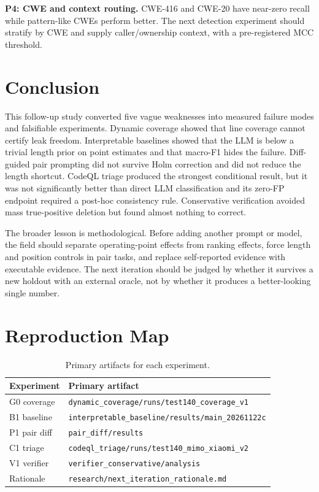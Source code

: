 \documentclass[conference]{IEEEtran}
\begin{document}
\textbf{P4: CWE and context routing.}
CWE-416 and CWE-20 have near-zero recall while pattern-like CWEs perform better. The next detection experiment should stratify by CWE and supply caller/ownership context, with a pre-registered MCC threshold.

\section{Conclusion}
\label{sec:conclusion}

This follow-up study converted five vague weaknesses into measured failure modes and falsifiable experiments. Dynamic coverage showed that line coverage cannot certify leak freedom. Interpretable baselines showed that the LLM is below a trivial length prior on point estimates and that macro-F1 hides the failure. Diff-guided pair prompting did not survive Holm correction and did not reduce the length shortcut. CodeQL triage produced the strongest conditional result, but it was not significantly better than direct LLM classification and its zero-FP endpoint required a post-hoc consistency rule. Conservative verification avoided mass true-positive deletion but found almost nothing to correct.

The broader lesson is methodological. Before adding another prompt or model, the field should separate operating-point effects from ranking effects, force length and position controls in pair tasks, and replace self-reported evidence with executable evidence. The next iteration should be judged by whether it survives a new holdout with an external oracle, not by whether it produces a better-looking single number.

\balance



\appendices
\section{Reproduction Map}
\begin{table}[h]
\centering
\caption{Primary artifacts for each experiment.}
\label{tab:artifacts}
\footnotesize
\begin{tabular}{@{}ll@{}}
\toprule
Experiment & Primary artifact \\
\midrule
G0 coverage & \texttt{dynamic\_coverage/runs/test140\_coverage\_v1} \\
B1 baseline & \texttt{interpretable\_baseline/results/main\_20261122c} \\
P1 pair diff & \texttt{pair\_diff/results} \\
C1 triage & \texttt{codeql\_triage/runs/test140\_mimo\_xiaomi\_v2} \\
V1 verifier & \texttt{verifier\_conservative/analysis} \\
Rationale & \texttt{research/next\_iteration\_rationale.md} \\
\bottomrule
\end{tabular}
\end{table}
\end{document}
